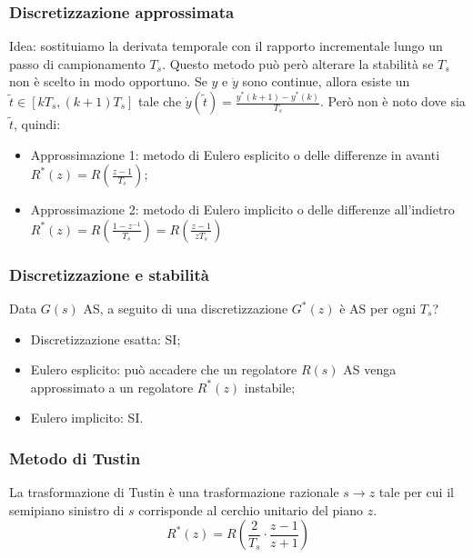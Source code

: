     \subsubsection{Discretizzazione approssimata}
    Idea: sostituiamo la derivata temporale con il rapporto incrementale lungo un passo di campionamento $T_s$.\newline
    Questo metodo può però alterare la stabilità se $T_s$ non è scelto in modo opportuno.\newline
    \newline
    Se $y$ e $\dot{y}$ sono continue, allora esiste un $\tilde{t} \in [kT_s, (k+1) T_s]$ tale che $\dot{y}(\tilde{t}) = \frac{y^*(k+1) - y^*(k)}{T_s}$.\newline
    \newline
    Però non è noto dove sia $\tilde{t}$, quindi:
    \begin{itemize}
        \item Approssimazione 1: metodo di Eulero esplicito o delle differenze in avanti $R^*(z) = R\left(\frac{z-1}{T_s}\right)$;
        \item Approssimazione 2: metodo di Eulero implicito o delle differenze all'indietro $R^*(z) = R\left(\frac{1-z^{-1}}{T_s}\right) = R\left(\frac{z-1}{z T_s}\right)$
    \end{itemize}
    \subsubsection{Discretizzazione e stabilità}
    Data $G(s)$ AS, a seguito di una discretizzazione $G^*(z)$ è AS per ogni $T_s$?
    \begin{itemize}
        \item Discretizzazione esatta: SI;
        \item Eulero esplicito: può accadere che un regolatore $R(s)$ AS venga approssimato a un regolatore $R^*(z)$ instabile;
        \item Eulero implicito: SI.
    \end{itemize}
    \subsubsection{Metodo di Tustin}
    La trasformazione di Tustin è una trasformazione razionale $s \rightarrow z$ tale per cui il semipiano sinistro di $s$ corrisponde al cerchio unitario del piano $z$.
    \[
        R^*(z) = R( \frac{2}{T_s} \cdot \frac{z-1}{z+1})
    \]
